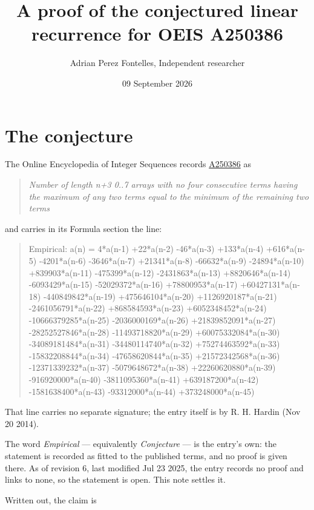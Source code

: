 \documentclass[11pt]{article}
\title{A proof of the conjectured linear recurrence for OEIS A250386}
\author{Adrian Perez Fontelles, Independent researcher}
\date{09 September 2026}
\theoremstyle{definition}
\begin{document}
\maketitle
\section{The conjecture}

The Online Encyclopedia of Integer Sequences records \href{https://oeis.org/A250386}{A250386} as

\begin{quote}\itshape Number of length n+3 0..7 arrays with no four consecutive terms having the maximum of any two terms equal to the minimum of the remaining two terms\end{quote}

and carries in its Formula section the line:

\begin{quote}\ttfamily Empirical: a(n) = 4*a(n-1) +22*a(n-2) -46*a(n-3) +133*a(n-4) +616*a(n-5) -4201*a(n-6) -3646*a(n-7) +21341*a(n-8) -66632*a(n-9) -24894*a(n-10) +839903*a(n-11) -475399*a(n-12) -2431863*a(n-13) +8820646*a(n-14) -6093429*a(n-15) -52029372*a(n-16) +78800953*a(n-17) +60427131*a(n-18) -440849842*a(n-19) +475646104*a(n-20) +1126920187*a(n-21) -2461056791*a(n-22) +868584593*a(n-23) +6052348452*a(n-24) -10666379285*a(n-25) -2036000169*a(n-26) +21839852091*a(n-27) -28252527846*a(n-28) -11493718820*a(n-29) +60075332084*a(n-30) -34089181484*a(n-31) -34480114740*a(n-32) +75274463592*a(n-33) -15832208844*a(n-34) -47658620844*a(n-35) +21572342568*a(n-36) -12371339232*a(n-37) -5079648672*a(n-38) +22260620880*a(n-39) -916920000*a(n-40) -3811095360*a(n-41) +639187200*a(n-42) -1581638400*a(n-43) -93312000*a(n-44) +373248000*a(n-45)\end{quote}

That line carries no separate signature; the entry itself is by R. H. Hardin (Nov 20 2014).

The word {\itshape Empirical} --- equivalently {\itshape Conjecture} --- is the entry's own: the statement is recorded as fitted to the published terms, and no proof is given there. As of revision 6, last modified Jul 23 2025, the entry records no proof and links to none, so the statement is open. This note settles it.

Written out, the claim is
\end{document}
